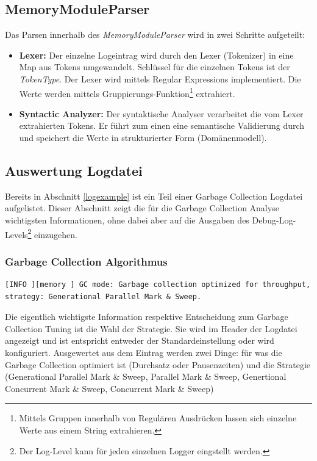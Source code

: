 \subsection{MemoryModuleParser}
Das Parsen innerhalb des \textit{MemoryModuleParser} wird in zwei Schritte aufgeteilt:
\begin{itemize}
\item \textbf{Lexer: }Der einzelne Logeintrag wird durch den Lexer (Tokenizer) in eine Map aus Tokens umgewandelt. Schlüssel für die einzelnen Tokens ist der \textit{TokenType}. Der Lexer wird mittels Regular Expressions implementiert. Die Werte werden mittels Gruppierungs-Funktion\footnote{Mittels Gruppen innerhalb von Regulären Ausdrücken lassen sich einzelne Werte aus einem String extrahieren.} extrahiert. 
\item \textbf{Syntactic Analyzer: }Der syntaktische Analyser verarbeitet die vom Lexer extrahierten Tokens. Er führt zum einen eine semantische Validierung durch und speichert die Werte in strukturierter Form (Domänenmodell).
\end{itemize}

\subsection{Auswertung Logdatei}
Bereits in Abschnitt \ref{logexample} ist ein Teil einer Garbage Collection Logdatei aufgelistet. Dieser Abschnitt zeigt die für die Garbage Collection Analyse wichtigsten Informationen, ohne dabei aber auf die Ausgaben des Debug-Log-Levels\footnote{Der Log-Level kann für jeden einzelnen Logger eingstellt werden.} einzugehen.

\subsubsection{Garbage Collection Algorithmus}
\begin{lstlisting}[numbers=none,  framexleftmargin=0mm, caption=Logdatei: Ausgabe initialer Garbage Collection Algorithmus]
[INFO ][memory ] GC mode: Garbage collection optimized for throughput, strategy: Generational Parallel Mark & Sweep.
\end{lstlisting}
Die eigentlich wichtigste Information respektive Entscheidung zum Garbage Collection Tuning ist die Wahl der Strategie. Sie wird im Header der Logdatei angezeigt und ist entspricht entweder der Standardeinstellung oder wird konfiguriert. Ausgewertet aus dem Eintrag werden zwei Dinge: für was die Garbage Collection optimiert ist (Durchsatz oder Pausenzeiten) und die Strategie (Generational Parallel Mark \& Sweep, Parallel Mark \& Sweep, Genertional Concurrent Mark \& Sweep, Concurrent Mark \& Sweep)
	
